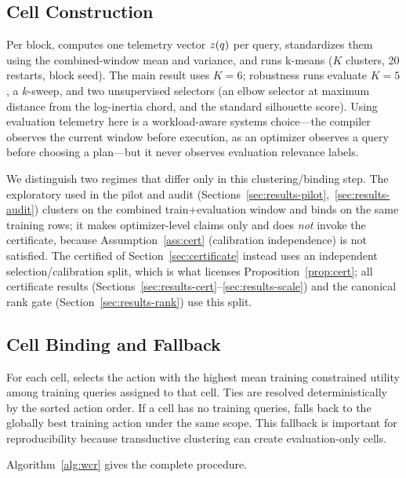 \subsection{Cell Construction}

Per block, \WCR{} computes one telemetry vector $z(q)$ per query, standardizes them using the combined-window mean and variance, and runs k-means ($K$ clusters, 20 restarts, block seed). The main result uses $K{=}6$; robustness runs evaluate $K{=}5$, a $k$-sweep, and two unsupervised selectors (an elbow selector at maximum distance from the log-inertia chord, and the standard silhouette score). Using evaluation telemetry here is a workload-aware systems choice---the compiler observes the current window before execution, as an optimizer observes a query before choosing a plan---but it never observes evaluation relevance labels.

We distinguish two regimes that differ only in this clustering/binding step. The exploratory \WCR{} used in the pilot and audit (Sections~\ref{sec:results-pilot},~\ref{sec:results-audit}) clusters on the combined train+evaluation window and binds on the same training rows; it makes optimizer-level claims only and does \emph{not} invoke the certificate, because Assumption~\ref{ass:cert} (calibration independence) is not satisfied. The certified \CWC{} of Section~\ref{sec:certificate} instead uses an independent selection/calibration split, which is what licenses Proposition~\ref{prop:cert}; all certificate results (Sections~\ref{sec:results-cert}--\ref{sec:results-scale}) and the canonical rank gate (Section~\ref{sec:results-rank}) use this split.

\subsection{Cell Binding and Fallback}

For each cell, \WCR{} selects the action with the highest mean training constrained utility among training queries assigned to that cell. Ties are resolved deterministically by the sorted action order. If a cell has no training queries, \WCR{} falls back to the globally best training action under the same scope. This fallback is important for reproducibility because transductive clustering can create evaluation-only cells.

Algorithm~\ref{alg:wcr} gives the complete procedure.

